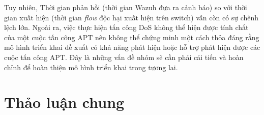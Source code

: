 \bigbreak\noindent
Tuy nhiên, Thời gian phản hồi (thời gian Wazuh đưa ra cảnh báo) so với thời gian xuất hiện (thời gian \textit{flow} độc hại xuất hiện trên switch) vẫn còn có sự chênh lệch lớn. Ngoài ra, việc thực hiện tấn công DoS không thể hiện được tính chất của một cuộc tấn công APT nên không thể chứng minh một cách thỏa đáng rằng mô hình triển khai đề xuất có khả năng phát hiện hoặc hỗ trợ phát hiện được các cuộc tấn công APT. Đây là những vấn đề nhóm sẽ cần phải cải tiến và hoàn chỉnh để hoàn thiện mô hình triển khai trong tương lai.

\section{Thảo luận chung}


